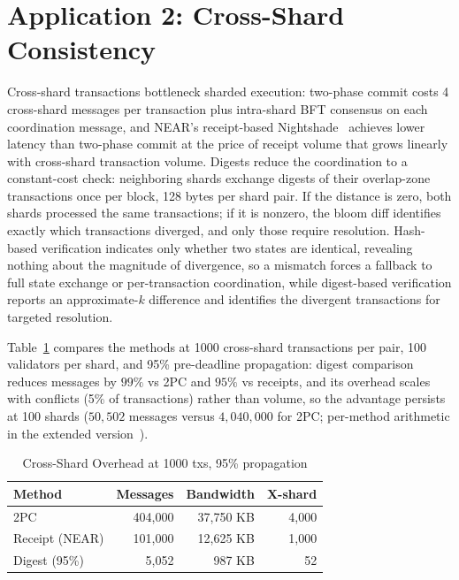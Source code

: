 \documentclass[runningheads]{llncs}
\begin{document}
\section{Application 2: Cross-Shard Consistency}
\label{sec:cross-shard}

Cross-shard transactions bottleneck sharded execution: two-phase commit costs 4 cross-shard messages per transaction plus intra-shard BFT consensus on each coordination message, and NEAR's receipt-based Nightshade~\cite{nightshade} achieves lower latency than two-phase commit at the price of receipt volume that grows linearly with cross-shard transaction volume. Digests reduce the coordination to a constant-cost check: neighboring shards exchange digests of their overlap-zone transactions once per block, 128 bytes per shard pair. If the distance is zero, both shards processed the same transactions; if it is nonzero, the bloom diff identifies exactly which transactions diverged, and only those require resolution. Hash-based verification indicates only whether two states are identical, revealing nothing about the magnitude of divergence, so a mismatch forces a fallback to full state exchange or per-transaction coordination, while digest-based verification reports an approximate-$k$ difference and identifies the divergent transactions for targeted resolution.

Table~\ref{tab:cross-shard} compares the methods at 1000 cross-shard transactions per pair, 100 validators per shard, and 95\% pre-deadline propagation: digest comparison reduces messages by $99\%$ vs 2PC and $95\%$ vs receipts, and its overhead scales with conflicts (5\% of transactions) rather than volume, so the advantage persists at 100 shards ($50{,}502$ messages versus $4{,}040{,}000$ for 2PC; per-method arithmetic in the extended version~\cite{proxima-tr}).

\begin{table}[tbp]
  \caption{Cross-Shard Overhead at 1000 txs, 95\% propagation}
  \label{tab:cross-shard}
  \centering
  \footnotesize
  \begin{tabular}{@{}lrrr@{}}
    \toprule
    \textbf{Method} & \textbf{Messages} & \textbf{Bandwidth} & \textbf{X-shard} \\
    \midrule
    2PC & 404{,}000 & 37{,}750 KB & 4{,}000 \\
    Receipt (NEAR) & 101{,}000 & 12{,}625 KB & 1{,}000 \\
    Digest (95\%) & 5{,}052 & 987 KB & 52 \\
    \bottomrule
  \end{tabular}
\end{table}
\end{document}
